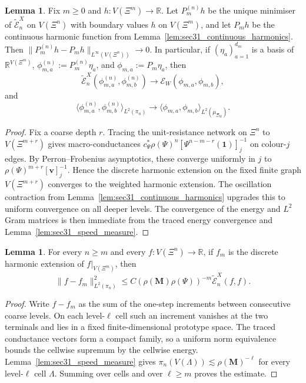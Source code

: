 \documentclass{article}
\theoremstyle{plain}
\theoremstyle{definition}
\newtheorem{lemma}[theorem]{Lemma}
\begin{document}
\begin{lemma}\label{lem:sec31_discrete_harmonics}
Fix $m\ge 0$ and $h:V(\Xi^m)\to\mathbb R$.
Let $P_m^{(n)}h$ be the unique minimiser of $\widetilde{\mathcal E}_n^{X}$ on $V(\Xi^n)$ with boundary values $h$ on $V(\Xi^m)$, and let $P_mh$ be the continuous harmonic function from Lemma~\ref{lem:sec31_continuous_harmonics}.
Then $\|P_m^{(n)}h-P_mh\|_{L^\infty(V(\Xi^n))}\to 0$.
In particular, if $(\eta_a)_{a=1}^{d_m}$ is a basis of $\mathbb R^{V(\Xi^m)}$, $\phi_{m,a}^{(n)}:=P_m^{(n)}\eta_a$, and $\phi_{m,a}:=P_m\eta_a$, then
\[
\widetilde{\mathcal E}_n^{X}(\phi_{m,a}^{(n)},\phi_{m,b}^{(n)})
\to
\mathcal E_W(\phi_{m,a},\phi_{m,b}),
\]
and
\[
\langle \phi_{m,a}^{(n)},\phi_{m,b}^{(n)}\rangle_{L^2(\pi_n)}
\to
\langle \phi_{m,a},\phi_{m,b}\rangle_{L^2(\mu_{\Xi_{\mathrm M}})}.
\]
\end{lemma}

\begin{proof}
Fix a coarse depth $r$.
Tracing the unit-resistance network on $\Xi^n$ to $V(\Xi^{m+r})$ gives macro-conductances $c_\Psi^*\rho(\Psi)^n[\Psi^{n-m-r}(\mathbf 1)]_j^{-1}$ on colour-$j$ edges.
By Perron--Frobenius asymptotics, these converge uniformly in $j$ to $\rho(\Psi)^{m+r}[\mathbf v]_j^{-1}$.
Hence the discrete harmonic extension on the fixed finite graph $V(\Xi^{m+r})$ converges to the weighted harmonic extension.
The oscillation contraction from Lemma~\ref{lem:sec31_continuous_harmonics} upgrades this to uniform convergence on all deeper levels.
The convergence of the energy and $L^2$ Gram matrices is then immediate from the traced energy convergence and Lemma~\ref{lem:sec31_speed_measure}.
\end{proof}

\begin{lemma}\label{lem:sec31_projection_tail_discrete}
For every $n\ge m$ and every $f:V(\Xi^n)\to\mathbb R$, if $f_m$ is the discrete harmonic extension of $f|_{V(\Xi^m)}$, then
\[
\|f-f_m\|_{L^2(\pi_n)}^2
\le
C(\rho(\mathbf M)\rho(\Psi))^{-m}\widetilde{\mathcal E}_n^{X}(f,f).
\]
\end{lemma}

\begin{proof}
Write $f-f_m$ as the sum of the one-step increments between consecutive coarse levels.
On each level-$\ell$ cell such an increment vanishes at the two terminals and lies in a fixed finite-dimensional prototype space.
The traced conductance vectors form a compact family, so a uniform norm equivalence bounds the cellwise supremum by the cellwise energy.
Lemma~\ref{lem:sec31_speed_measure} gives $\pi_n(V(\Lambda))\lesssim \rho(\mathbf M)^{-\ell}$ for every level-$\ell$ cell $\Lambda$.
Summing over cells and over $\ell\ge m$ proves the estimate.
\end{proof}
\end{document}
